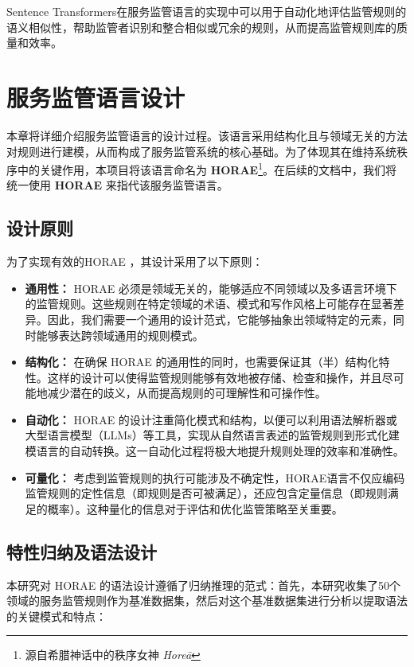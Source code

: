 Sentence Transformers在服务监管语言的实现中可以用于自动化地评估监管规则的语义相似性，帮助监管者识别和整合相似或冗余的规则，从而提高监管规则库的质量和效率。

\cleardoublepage

\section{服务监管语言设计}

本章将详细介绍服务监管语言的设计过程。该语言采用结构化且与领域无关的方法对规则进行建模，从而构成了服务监管系统的核心基础。为了体现其在维持系统秩序中的关键作用，本项目将该语言命名为 \textbf{HORAE}\footnote{源自希腊神话中的秩序女神 \textit{Horeā}}。在后续的文档中，我们将统一使用 \textbf{HORAE }  来指代该服务监管语言。

\subsection{设计原则}

为了实现有效的HORAE ，其设计采用了以下原则：

\begin{itemize}
    \item \textbf{通用性：} HORAE 必须是领域无关的，能够适应不同领域以及多语言环境下的监管规则。这些规则在特定领域的术语、模式和写作风格上可能存在显著差异。因此，我们需要一个通用的设计范式，它能够抽象出领域特定的元素，同时能够表达跨领域通用的规则模式。
    \item \textbf{结构化：} 在确保 HORAE 的通用性的同时，也需要保证其（半）结构化特性。这样的设计可以使得监管规则能够有效地被存储、检查和操作，并且尽可能地减少潜在的歧义，从而提高规则的可理解性和可操作性。
    \item \textbf{自动化：} HORAE 的设计注重简化模式和结构，以便可以利用语法解析器或大型语言模型（LLMs）等工具，实现从自然语言表述的监管规则到形式化建模语言的自动转换。这一自动化过程将极大地提升规则处理的效率和准确性。
    \item \textbf{可量化：} 考虑到监管规则的执行可能涉及不确定性，HORAE语言不仅应编码监管规则的定性信息（即规则是否可被满足），还应包含定量信息（即规则满足的概率）。这种量化的信息对于评估和优化监管策略至关重要。
\end{itemize}

\subsection{特性归纳及语法设计}

本研究对 HORAE 的语法设计遵循了归纳推理的范式：首先，本研究收集了50个领域的服务监管规则作为基准数据集，然后对这个基准数据集进行分析以提取语法的关键模式和特点：

